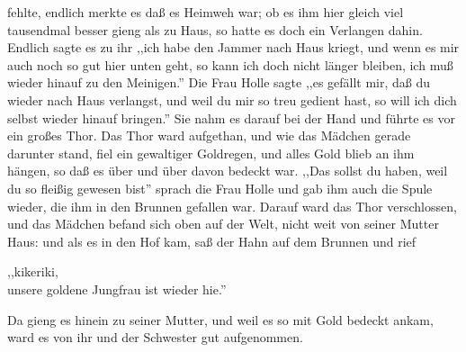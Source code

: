 \documentclass[10pt,a4paper]{article}
\begin{document}
fehlte, endlich merkte es daß es Heimweh war; ob es ihm hier gleich viel
tausendmal besser gieng als zu Haus, so hatte es doch ein Verlangen dahin.
Endlich sagte es zu ihr ,,ich habe den Jammer nach Haus kriegt, und wenn es mir
auch noch so gut hier unten geht, so kann ich doch nicht länger bleiben, ich muß
wieder hinauf zu den Meinigen.'' Die Frau Holle sagte ,,es gefällt mir, daß du
wieder nach Haus verlangst, und weil du mir so treu gedient hast, so will ich
dich selbst wieder hinauf bringen.'' Sie nahm es darauf bei der Hand und führte
es vor ein großes Thor. Das Thor ward aufgethan, und wie das Mädchen gerade
darunter stand, fiel ein gewaltiger Goldregen, und alles Gold blieb an ihm
hängen, so daß es über und über davon bedeckt war. ,,Das sollst du haben, weil
du so fleißig gewesen bist'' sprach die Frau Holle und gab ihm auch die Spule
wieder, die ihm in den Brunnen gefallen war. Darauf ward das Thor verschlossen,
und das Mädchen befand sich oben auf der Welt, nicht weit von seiner Mutter
Haus: und als es in den Hof kam, saß der Hahn auf dem Brunnen und rief

\vskip 4pt
,,kikeriki, \\
unsere goldene Jungfrau ist wieder hie.''

\vskip 4pt
Da gieng es hinein zu seiner Mutter, und weil es so mit Gold bedeckt ankam, ward
es von ihr und der Schwester gut aufgenommen.
\end{document}
